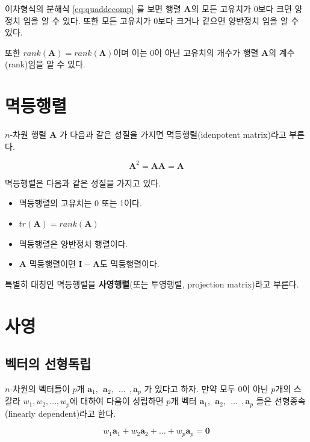 \documentclass[
]{book}
\providecommand{\tightlist}{%
  \setlength{\itemsep}{0pt}\setlength{\parskip}{0pt}}
\theoremstyle{definition}
\theoremstyle{definition}
\theoremstyle{definition}
\theoremstyle{remark}
\begin{document}
이차형식의 분해식 \eqref{eq:quaddecomp} 를 보면 행렬 \(\bm A\)의 모든 고유치가 0보다 크면 양정치 임을 알 수 있다. 또한 모든 고유치가 0보다 크거나 같으면 양반정치 임을 알 수 있다.

또한 \(rank(\bm A) = rank(\bm \Lambda)\)이며 이는 0이 아닌 고유치의 개수가 행렬 \(\bm A\)의 계수(rank)임을 알 수 있다.

\hypertarget{uxba71uxb4f1uxd589uxb82c}{%
\section{멱등행렬}\label{uxba71uxb4f1uxd589uxb82c}}

\(n\)-차원 행렬 \(\bm A\) 가 다음과 같은 성질을 가지면 멱등행렬(idenpotent matrix)라고 부른다.

\[ \bm A^2 = \bm A \bm A = \bm A \]

멱등행렬은 다음과 같은 성질을 가지고 있다.

\begin{itemize}
\tightlist
\item
  멱등행렬의 고유치는 0 또는 1이다.
\item
  \(tr(\bm A) =rank(\bm A)\)
\item
  멱등행렬은 양반정치 행렬이다.
\item
  \(\bm A\) 멱등행렬이면 \(\bm I - \bm A\)도 멱등행렬이다.
\end{itemize}

특별히 대칭인 멱등행렬을 \textbf{사영행렬}(또는 투영행렬, projection matrix)라고 부른다.

\hypertarget{uxc0acuxc601}{%
\section{사영}\label{uxc0acuxc601}}

\hypertarget{uxbca1uxd130uxc758-uxc120uxd615uxb3c5uxb9bd}{%
\subsection{벡터의 선형독립}\label{uxbca1uxd130uxc758-uxc120uxd615uxb3c5uxb9bd}}

\(n\)-차원의 벡터들이 \(p\)개 \(\bm a_1, ~~ \bm a_2, ~~\dots ~~, \bm a_p\) 가 있다고 하자.
만약 모두 \(0\)이 아닌 \(p\)개의 스칼라 \(w_1,w_2,\dots,w_p\)에 대하여 다음이 성립하면 \(p\)개 벡터 \(\bm a_1, ~~ \bm a_2, ~~\dots ~~, \bm a_p\) 들은 선형종속(linearly dependent)라고 한다.

\begin{equation}
w_1 \bm a_1 + w_2 \bm a_2 + \dots + w_p \bm a_p = \bm 0 
\label{eq:lineardep}
\end{equation}
\end{document}

